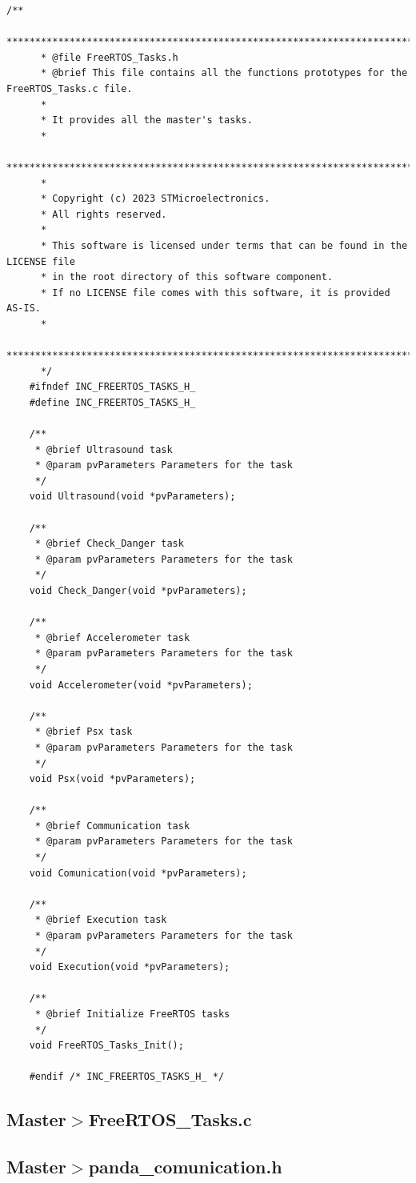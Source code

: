 \documentclass{article}
\begin{document}
    \begin{lstlisting}[style=CStyle]
    /**
      ******************************************************************************
      * @file FreeRTOS_Tasks.h
      * @brief This file contains all the functions prototypes for the FreeRTOS_Tasks.c file.
      *
      *	It provides all the master's tasks.
      *
      ******************************************************************************
      *
      * Copyright (c) 2023 STMicroelectronics.
      * All rights reserved.
      *
      * This software is licensed under terms that can be found in the LICENSE file
      * in the root directory of this software component.
      * If no LICENSE file comes with this software, it is provided AS-IS.
      *
      ******************************************************************************
      */
    #ifndef INC_FREERTOS_TASKS_H_
    #define INC_FREERTOS_TASKS_H_
    
    /**
     * @brief Ultrasound task
     * @param pvParameters Parameters for the task
     */
    void Ultrasound(void *pvParameters);
    
    /**
     * @brief Check_Danger task
     * @param pvParameters Parameters for the task
     */
    void Check_Danger(void *pvParameters);
    
    /**
     * @brief Accelerometer task
     * @param pvParameters Parameters for the task
     */
    void Accelerometer(void *pvParameters);
    
    /**
     * @brief Psx task
     * @param pvParameters Parameters for the task
     */
    void Psx(void *pvParameters);
    
    /**
     * @brief Communication task
     * @param pvParameters Parameters for the task
     */
    void Comunication(void *pvParameters);
    
    /**
     * @brief Execution task
     * @param pvParameters Parameters for the task
     */
    void Execution(void *pvParameters);
    
    /**
     * @brief Initialize FreeRTOS tasks
     */
    void FreeRTOS_Tasks_Init();
    
    #endif /* INC_FREERTOS_TASKS_H_ */
    \end{lstlisting}
    
    \subsection{Master$>$FreeRTOS\_Tasks.c}

    \subsection{Master$>$panda\_comunication.h}
\end{document}
